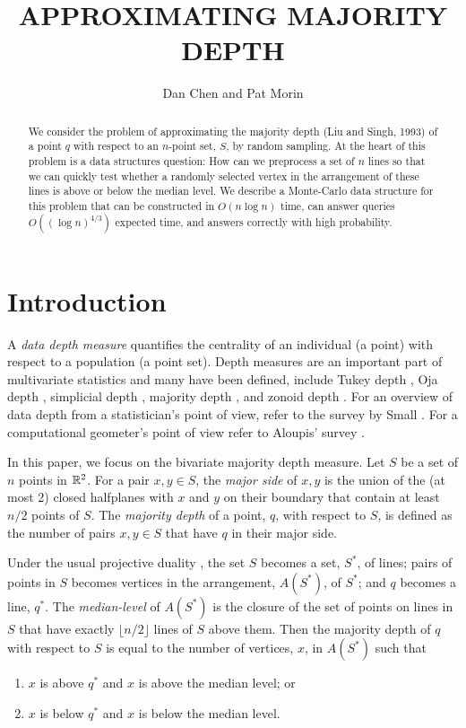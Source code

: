 \documentclass{patmorin}
\title{\MakeUppercase{Approximating Majority Depth}}
\author{Dan Chen and Pat Morin}
\begin{document}
\maketitle

\begin{abstract}
We consider the problem of approximating the majority depth (Liu and
Singh, 1993) of a point $q$ with respect to an $n$-point set, $S$,
by random sampling.  At the heart of this problem is a data structures
question: How can we preprocess a set of $n$ lines so that we can quickly
test whether a randomly selected vertex in the arrangement of these
lines is above or below the median level.  We describe a Monte-Carlo data
structure for this problem that can be constructed in $O(n\log n)$ time,
can answer queries $O((\log n)^{4/3})$ expected time, and answers correctly
with high probability.
\end{abstract}

\section{Introduction}

A \emph{data depth measure} quantifies the centrality
of an individual (a point) with respect to a population (a point set).
Depth measures are an important part of multivariate statistics and many
have been defined, include Tukey depth \cite{t74}, Oja
depth \cite{o83}, simplicial depth \cite{l90}, majority depth \cite{ls93},
and zonoid depth \cite{dkm96}.  For an overview of data depth from a
statistician's point of view, refer to the survey by Small \cite{s90}.
For a computational geometer's point of view refer to Aloupis' survey
\cite{a06}.

In this paper, we focus on the bivariate majority depth measure.
Let $S$ be a set of $n$ points in $\mathbb{R}^2$.  For a pair $x,y\in S$,
the \emph{major side} of $x,y$ is the union of the (at most 2) closed
halfplanes with $x$ and $y$ on their boundary that contain at least $n/2$
points of $S$.  The \emph{majority depth} \cite{ls93,s91} of a point,
$q$, with respect to $S$, is defined as the number of pairs $x,y\in S$
that have $q$ in their major side.

Under the usual projective duality \cite{e97}, the set $S$ becomes
a set, $S^*$, of lines; pairs of points in $S$ becomes vertices
in the arrangement, $A(S^*)$, of $S^*$; and $q$ becomes a line, $q^*$.
The \emph{median-level} of $A(S^*)$ is the closure of the set of points
on lines in $S$ that have exactly $\lfloor n/2\rfloor$ lines of $S$
above them.  Then the majority depth of $q$ with respect to $S$ is equal
to the number of vertices, $x$, in $A(S^*)$ such that
\begin{enumerate}
\item $x$ is above $q^*$ and $x$ is above the median level; or
\item $x$ is below $q^*$ and $x$ is below the median level.
\end{enumerate}
\end{document}
